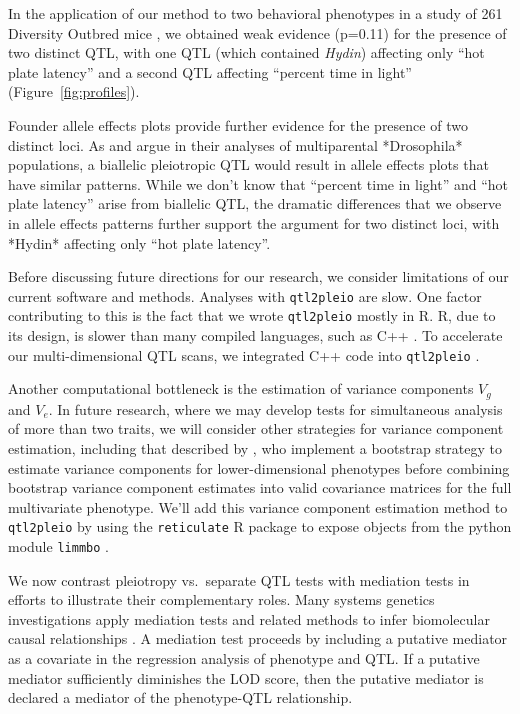 \documentclass[12pt,twoside, lineno]{gsajnl}
\begin{document}
In the application of our method to two behavioral phenotypes in a
study of 261 Diversity Outbred mice
\citep{recla2014precise,logan2013high}, we obtained weak evidence
(p=0.11) for the presence of two distinct QTL, with one QTL (which
contained \textit{Hydin}) affecting only ``hot plate latency'' and a
second QTL affecting ``percent time in light'' (Figure~\ref{fig:profiles}).

Founder allele effects plots provide further evidence for the presence
of two distinct loci. As \citet{macdonald2007joint} and
\citet{king2012genetic} argue in their analyses of multiparental
*Drosophila* populations, a biallelic pleiotropic QTL would result in
allele effects plots that have similar patterns. While we don't know
that ``percent time in light'' and ``hot plate latency'' arise from
biallelic QTL, the dramatic differences that we observe in allele
effects patterns further support the argument for two distinct loci,
with *Hydin* affecting only ``hot plate latency''.

Before discussing future directions for our research, we consider
limitations of our current software and methods. Analyses with
\texttt{qtl2pleio} are slow. One factor contributing to this is the
fact that we wrote \texttt{qtl2pleio} mostly in R. R, due to its
design, is slower than many compiled languages, such as C++
\citep{wickham2014advanced}. To accelerate our multi-dimensional QTL
scans, we integrated C++ code into \texttt{qtl2pleio}
\citep{eddelbuettel2011rcpp}.

Another computational bottleneck is the estimation of variance
components $V_g$ and $V_e$. In future research, where we may develop
tests for simultaneous analysis of more than two traits, we will
consider other strategies for variance component estimation, including
that described by \citet{hannah2018limmbo}, who implement a bootstrap
strategy to estimate variance components for lower-dimensional
phenotypes before combining bootstrap variance component estimates
into valid covariance matrices for the full multivariate phenotype.
We'll add this variance component estimation method to
\texttt{qtl2pleio} by using the \texttt{reticulate} R package to
expose objects from the python module \texttt{limmbo}
\citep{reticulate}.


We now contrast pleiotropy vs.\ separate QTL tests with mediation tests
in efforts to illustrate their complementary roles. Many systems
genetics investigations apply mediation tests and related methods to
infer biomolecular causal relationships
\citep{chick2016defining,schadt2005integrative,baron1986moderator}. A
mediation test proceeds by including a putative mediator as a
covariate in the regression analysis of phenotype and QTL. If a
putative mediator sufficiently diminishes the LOD score, then the
putative mediator is declared a mediator of the phenotype-QTL
relationship.
\end{document}
